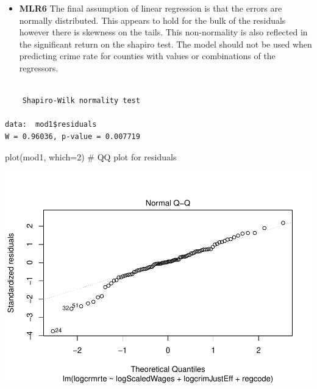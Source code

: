 \documentclass[]{article}
\newenvironment{Shaded}{}{}
\newcommand{\CommentTok}[1]{\textcolor[rgb]{0.00,0.50,0.00}{#1}}
\newcommand{\DataTypeTok}[1]{#1}
\newcommand{\DecValTok}[1]{#1}
\newcommand{\KeywordTok}[1]{\textcolor[rgb]{0.00,0.00,1.00}{#1}}
\newcommand{\NormalTok}[1]{#1}
\newcommand{\OperatorTok}[1]{#1}
\providecommand{\tightlist}{%
  \setlength{\itemsep}{0pt}\setlength{\parskip}{0pt}}
\begin{document}
\begin{itemize}
\tightlist
\item
  \textbf{MLR6} The final assumption of linear regression is that the
  errors are normally distributed. This appears to hold for the bulk of
  the residuals however there is skewness on the tails. This
  non-normality is also reflected in the significant return on the
  shapiro test. The model should not be used when predicting crime rate
  for counties with values or combinations of the regressors.
\end{itemize}

\begin{Shaded}
\end{Shaded}

\begin{verbatim}

    Shapiro-Wilk normality test

data:  mod1$residuals
W = 0.96036, p-value = 0.007719
\end{verbatim}

\begin{Shaded}
\begin{Highlighting}[]
\KeywordTok{plot}\NormalTok{(mod1, }\DataTypeTok{which=}\DecValTok{2}\NormalTok{) }\CommentTok{# QQ plot for residuals}
\end{Highlighting}
\end{Shaded}

\includegraphics{Bagnard_Gaustad_Hartman_Leung_Lab_3_files/figure-latex/unnamed-chunk-65-1.pdf}
\end{document}

